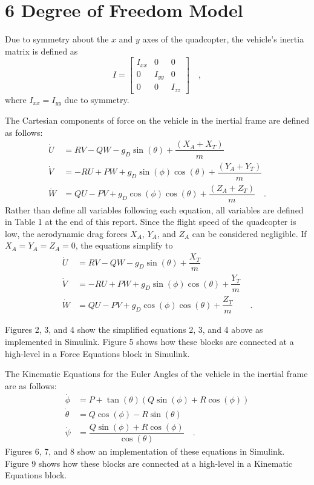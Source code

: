 \section*{6 Degree of Freedom Model}

Due to symmetry about the $x$ and $y$ axes of the quadcopter, the vehicle's inertia matrix is defined as
\begin{equation}
    I = 
    \begin{bmatrix}
        I_{xx} & 0 & 0 \\
        0 & I_{yy} & 0 \\
        0 & 0 & I_{zz}
    \end{bmatrix} \quad ,
\end{equation} where $I_{xx} = I_{yy}$ due to symmetry.

The Cartesian components of force on the vehicle in the inertial frame are defined as follows:
\begin{align*}
    \dot{U} &= RV - QW - g_D\sin(\theta) + \dfrac{(X_A + X_T)}{m} \\
    \dot{V} &= -RU + PW + g_D\sin(\phi)\cos(\theta) + \dfrac{(Y_A + Y_T)}{m} \\
    \dot{W} &= QU - PV + g_D\cos(\phi)\cos(\theta) + \dfrac{(Z_A + Z_T)}{m} \quad .
\end{align*}
Rather than define all variables following each equation, all variables are defined in Table 1 at the end of this report. Since the flight speed of the quadcopter is low, the aerodynamic drag forces $X_A$, $Y_A$, and $Z_A$ can be considered negligible. If $X_A = Y_A = Z_A = 0$, the equations simplify to
\begin{align}
    \dot{U} &= RV - QW - g_D\sin(\theta) + \dfrac{X_T}{m} \\
    \dot{V} &= -RU + PW + g_D\sin(\phi)\cos(\theta) + \dfrac{Y_T}{m} \\
    \dot{W} &= QU - PV + g_D\cos(\phi)\cos(\theta) + \dfrac{Z_T}{m} \quad\quad .
\end{align}

Figures 2, 3, and 4 show the simplified equations 2, 3, and 4 above as implemented in Simulink. Figure 5 shows how these blocks are connected at a high-level in a Force Equations block in Simulink.

The Kinematic Equations for the Euler Angles of the vehicle in the inertial frame are as follows:
\begin{align}
    \dot{\phi} &= P + \tan(\theta)(Q\sin(\phi) + R\cos(\phi)) \\
    \dot{\theta} &= Q\cos(\phi) - R\sin(\theta) \\
    \dot{\psi} &= \dfrac{Q\sin(\phi) + R\cos(\phi)}{\cos(\theta)} \quad .
\end{align}
Figures 6, 7, and 8 show an implementation of these equations in Simulink. Figure 9 shows how these blocks are connected at a high-level in a Kinematic Equations block.

